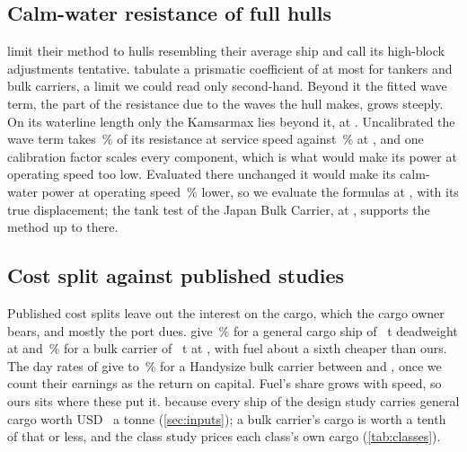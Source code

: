 \subsection{Calm-water resistance of full hulls}
\label{app:full_hulls}

\citet{holtrop1982} limit their method to hulls resembling their average ship and call its high-block adjustments tentative. \citet{ortigosa2009} tabulate a prismatic coefficient of at most  for tankers and bulk carriers, a limit we could read only second-hand. Beyond it the fitted wave term, the part of the resistance due to the waves the hull makes, grows steeply. On its waterline length only the Kamsarmax lies beyond it, at . Uncalibrated the wave term takes \,\% of its resistance at service speed against \,\% at , and one calibration factor scales every component, which is what would make its power at operating speed too low. Evaluated there unchanged it would make its calm-water power at operating speed \,\% lower, so we evaluate the formulas at , with its true displacement; the tank test of the Japan Bulk Carrier, at , supports the method up to there.

\subsection{Cost split against published studies}
\label{app:cost_split}

Published cost splits leave out the interest on the cargo, which the cargo owner bears, and mostly the port dues.   give \,\% for a general cargo ship of ~t deadweight at  and \,\% for a bulk carrier of ~t at , with fuel about a sixth cheaper than ours. The day rates of \citet{healy2019} give  to \,\% for a Handysize bulk carrier between  and , once we count their earnings as the return on capital. Fuel's share grows with speed, so ours sits where these put it.   because every ship of the design study carries general cargo worth USD~ a tonne (\cref{sec:inputs}); a bulk carrier's cargo is worth a tenth of that or less, and the class study prices each class's own cargo (\cref{tab:classes}).

